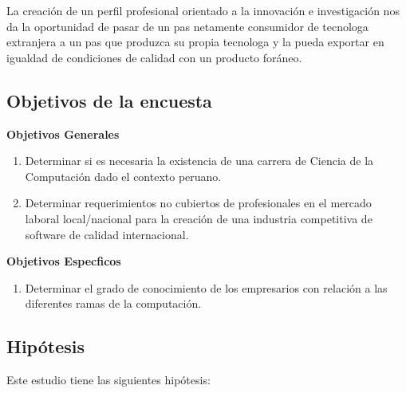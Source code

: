 La creación de un perfil profesional orientado a la innovación e investigación nos da la oportunidad de pasar de un pa­s netamente consumidor de tecnolog­a extranjera a un pa­s que produzca su propia tecnolog­a y la pueda exportar en igualdad de condiciones de calidad con un producto foráneo.

\subsection{Objetivos de la encuesta}

\textbf{Objetivos Generales}
\begin{enumerate}
\item Determinar si es necesaria la existencia de una carrera de Ciencia de la Computación dado el contexto peruano.
\item Determinar requerimientos no cubiertos de profesionales en el mercado laboral local/nacional para la creación de una industria competitiva de software de calidad internacional.
\end{enumerate}

\textbf{Objetivos Espec­ficos}
\begin{enumerate}
 \item Determinar el grado de conocimiento de los empresarios con relación a las diferentes ramas de la computación.
\end{enumerate}

\subsection{Hipótesis}
Este estudio tiene las siguientes hipótesis:

